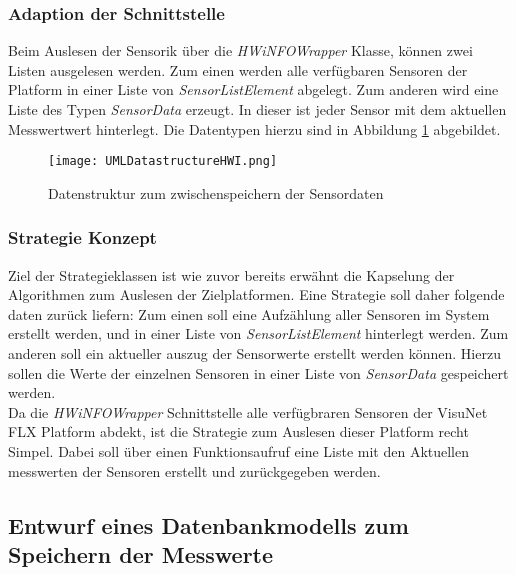 \subsubsection*{Adaption der Schnittstelle}
Beim Auslesen der Sensorik über die \textit{HWiNFOWrapper} Klasse, können zwei Listen ausgelesen werden. Zum einen werden alle verfügbaren Sensoren der Platform in einer Liste von \textit{SensorListElement} abgelegt. Zum anderen wird eine Liste des Typen \textit{SensorData} erzeugt. In dieser ist jeder Sensor mit dem aktuellen Messwertwert hinterlegt. Die Datentypen hierzu sind in Abbildung \ref{fig:DatastructuresUML} abgebildet.      
\begin{center}
    \begin{figure}[h!]
        \centering
        \texttt{[image: UMLDatastructureHWI.png]}
        \caption{Datenstruktur zum zwischenspeichern der Sensordaten}
        \label{fig:DatastructuresUML}
    \end{figure}
\end{center}
\vspace{-1.8cm}

\subsubsection*{Strategie Konzept}
Ziel der Strategieklassen ist wie zuvor bereits erwähnt die Kapselung der Algorithmen zum Auslesen der Zielplatformen. Eine Strategie soll daher folgende daten zurück liefern: Zum einen soll eine Aufzählung aller Sensoren im System erstellt werden, und in einer Liste von \textit{SensorListElement} hinterlegt werden. Zum anderen soll ein aktueller auszug der Sensorwerte erstellt werden können. Hierzu sollen die Werte der einzelnen Sensoren in einer Liste von \textit{SensorData} gespeichert werden.\\
Da die \textit{HWiNFOWrapper} Schnittstelle alle verfügbraren Sensoren der VisuNet FLX Platform abdekt, ist die Strategie zum Auslesen dieser Platform recht Simpel. Dabei soll über einen Funktionsaufruf  eine Liste mit den Aktuellen messwerten der Sensoren erstellt und zurückgegeben werden. 

\subsection{Entwurf eines Datenbankmodells zum Speichern der Messwerte}
